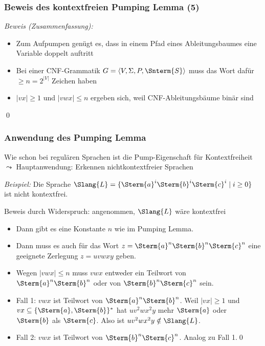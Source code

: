 \documentclass[aspectratio=1610,onlymath]{beamer}
\begin{document}
\begin{frame}[t]\frametitle{Beweis des kontextfreien Pumping Lemma (5)}

\vspace{-1ex}
\medskip

\emph{Beweis (Zusammenfassung):} 
\begin{itemize}
\item Zum Aufpumpen genügt es, dass in einem Pfad eines Ableitungsbaumes eine Variable doppelt auftritt
\item Bei einer CNF-Grammatik $G=\tuple{V,\Sigma,P,\Snterm{S}}$ muss das Wort dafür $\geq n=2^{|V|}$ Zeichen haben
\item $|vx|\geq 1$ und $|vwx|\leq n$ ergeben sich, weil CNF-Ableitungsbäume binär sind
\end{itemize}
\qed
% 
\end{frame}

\begin{frame}\frametitle{Anwendung des Pumping Lemma}

Wie schon bei regulären Sprachen ist die Pump-Eigenschaft 
für Kontextfreiheit\\
$\leadsto$ Hauptanwendung: Erkennen nichtkontextfreier Sprachen
\medskip\pause

\emph{Beispiel:} Die Sprache $\Slang{L}=\{\Sterm{a}^i\Sterm{b}^i\Sterm{c}^i\mid i\geq 0\}$ ist nicht kontextfrei.
\medskip\pause

Beweis durch Widerspruch: angenommen, $\Slang{L}$ wäre kontextfrei\pause
\begin{itemize}
\item Dann gibt es eine Konstante $n$ wie im Pumping Lemma.\pause
\item Dann muss es auch für das Wort $z=\Sterm{a}^n\Sterm{b}^n\Sterm{c}^n$ eine geeignete Zerlegung $z=uvwxy$ geben.\pause
\item Wegen $|vwx|\leq n$ muss $vwx$ entweder ein Teilwort von $\Sterm{a}^n\Sterm{b}^n$ oder von $\Sterm{b}^n\Sterm{c}^n$ sein.\pause
\item Fall 1: $vwx$ ist Teilwort von $\Sterm{a}^n\Sterm{b}^n$. Weil $|vx|\geq 1$ und $vx\subseteq\{\Sterm{a},\Sterm{b}\}^*$
hat $uv^2wx^2y$ mehr $\Sterm{a}$ oder $\Sterm{b}$ als $\Sterm{c}$. Also ist $uv^2wx^2y\notin\Slang{L}$.
\pause
\item Fall 2: $vwx$ ist Teilwort von $\Sterm{b}^n\Sterm{c}^n$. Analog zu Fall 1.\qed
\end{itemize}

\end{frame}
\end{document}
